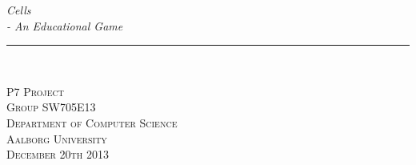 \thispagestyle{empty}
\begin{flushright}
\vspace{3cm}

\phantom{hul}

\phantom{hul}

\phantom{hul}

\textsl{\Huge Cells}\\ \vspace{0.3cm}
\textsl{\Huge - An Educational Game} \vspace{0.5cm}

\rule{13cm}{3mm} \\ \vspace{1.5cm}
\vspace{1cm}


\vspace{1.5cm} 
\textsc{\Large P7 Project \\
Group SW705E13 \\
Department of Computer Science\\
Aalborg University\\
December 20th 2013\\}
\end{flushright}
